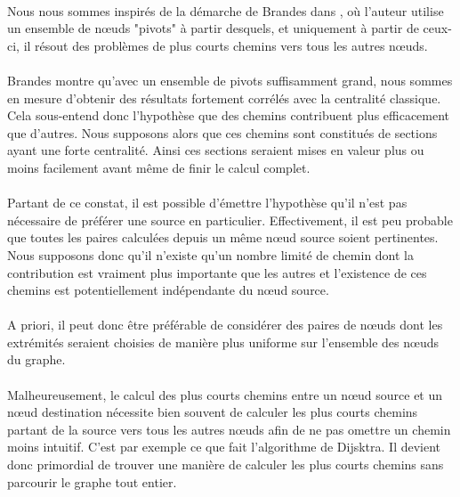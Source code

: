 \documentclass[a4paper, 10pt]{report}
\begin{document}
\paragraph{}Nous nous sommes inspirés de la démarche de Brandes dans \cite{Brandes2007Centrality}, où l'auteur utilise un ensemble de n\oe uds "pivots" à partir desquels, et uniquement à partir de ceux-ci, il résout des problèmes de plus courts chemins vers tous les autres n\oe uds. 

\paragraph{}Brandes montre qu'avec un ensemble de pivots suffisamment grand, nous sommes en mesure d'obtenir des résultats fortement corrélés avec la centralité classique. Cela sous-entend donc l'hypothèse que des chemins contribuent plus efficacement que d'autres. Nous supposons alors que ces chemins sont constitués de sections ayant une forte centralité. Ainsi ces sections seraient mises en valeur plus ou moins facilement avant même de finir le calcul complet.

\paragraph{}Partant de ce constat, il est possible d'émettre l'hypothèse qu'il n'est pas nécessaire de préférer une source en particulier. Effectivement, il est peu probable que toutes les paires calculées depuis un même n\oe ud source soient pertinentes. Nous supposons donc qu'il n'existe qu'un nombre limité de chemin dont la contribution est vraiment plus importante que les autres et l'existence de ces chemins est potentiellement indépendante du n\oe ud source.

\paragraph{}A priori, il peut donc être préférable de considérer des paires de n\oe uds dont les extrémités seraient choisies de manière plus uniforme sur l'ensemble des n\oe uds du graphe.

\paragraph{}Malheureusement, le calcul des plus courts chemins entre un n\oe ud source et un n\oe ud destination nécessite bien souvent de calculer les plus courts chemins partant de la source vers tous les autres n\oe uds afin de ne pas omettre un chemin moins intuitif. C'est par exemple ce que fait l'algorithme de Dijsktra. Il devient donc primordial de trouver une manière de calculer les plus courts chemins sans parcourir le graphe tout entier. 
\end{document}

